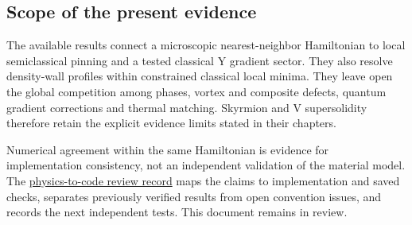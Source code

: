 \subsection{Scope of the present
evidence}\label{scope-of-the-present-evidence}

The available results connect a microscopic nearest-neighbor Hamiltonian
to local semiclassical pinning and a tested classical Y gradient sector.
They also resolve density-wall profiles within constrained classical
local minima. They leave open the global competition among phases,
vortex and composite defects, quantum gradient corrections and thermal
matching. Skyrmion and V supersolidity therefore retain the explicit
evidence limits stated in their chapters.

Numerical agreement within the same Hamiltonian is evidence for
implementation consistency, not an independent validation of the
material model. The
\href{../../../GOVERNMENT/Working-Pad/issue-notes/open/260918-nbcp-physics-code-review.md}{physics-to-code
review record} maps the claims to implementation and saved checks,
separates previously verified results from open convention issues, and
records the next independent tests. This document remains in review.
